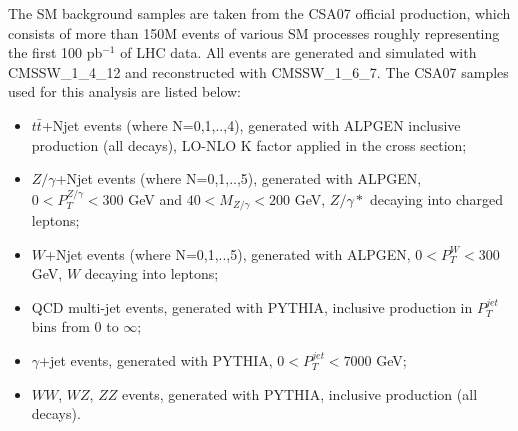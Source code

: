 \documentclass[colclass=cmspaper]{combine}
\begin{document}
\begin{linenumbers}
%


The SM background samples are taken from the CSA07 official production,
which consists of more than 150M events of various SM processes roughly representing the first 100 pb$^{-1}$ of LHC data.
All events are generated and simulated with CMSSW\_1\_4\_12 and reconstructed with CMSSW\_1\_6\_7. 
The CSA07 samples used for this analysis are listed below:
\begin{itemize}
%
\item $t\bar{t}$+Njet events (where N=0,1,..,4), generated with ALPGEN \cite{Mangano:2002ea} inclusive production (all decays), LO-NLO K factor applied 
in the cross section; 
%
\item $Z/\gamma$+Njet events (where N=0,1,..,5), generated with ALPGEN, $ 0 < P_{T}^{Z/\gamma} < 300 $ GeV and $40<M_{Z/\gamma}<200$ GeV, 
$Z/\gamma*$ decaying into charged leptons;  
%
\item $W$+Njet events (where N=0,1,..,5), generated with ALPGEN, $ 0 < P_{T}^{W} < 300 $ GeV, $W$ decaying into leptons;  
%
\item QCD multi-jet events, generated with PYTHIA, inclusive production in $P_{T}^{jet}$ bins from 0 to $\infty$;  
%
\item $\gamma$+jet events, generated with PYTHIA, $ 0 < P_{T}^{jet} < 7000 $ GeV;  
%
\item $WW$, $WZ$, $ZZ$ events, generated with PYTHIA, inclusive production (all decays).
\end{itemize} 


\end{linenumbers}
\end{document}
